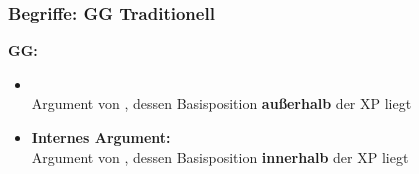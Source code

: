 \begin{frame}
\frametitle{Begriffe: GG \vs Traditionell}

\begin{minipage}[b]{0.47\textwidth}

	\textbf{GG:}

	\begin{itemize}
		\item {}\\
		Argument von , dessen Basisposition \textbf{außerhalb} der XP liegt
\medskip
		\item \textbf{Internes Argument:}\\
		Argument von , dessen Basisposition \textbf{innerhalb} der XP liegt
	\end{itemize}	
\end{minipage}  
\begin{minipage}[b]{0.48\textwidth}
	\begin{figure}
	\centering
	\end{figure}
\end{minipage}    

\end{frame}


